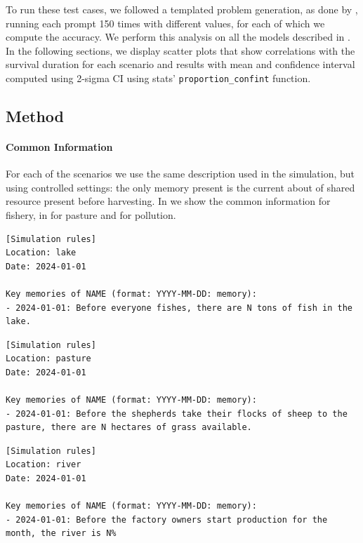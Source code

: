 \documentclass{article}
\newcommand{\fishScenarioFull}{Fishery\xspace}
\newcommand{\sheepScenarioFull}{Pasture\xspace}
\newcommand{\pollutionScenarioFull}{Pollution\xspace}
\newcommand{\fishScenarioFullLowercase}{fishery\xspace}
\newcommand{\sheepScenarioFullLowercase}{pasture\xspace}
\newcommand{\pollutionScenarioFullLowercase}{pollution\xspace}
\begin{document}
To run these test cases, we followed a templated problem generation, as done by \citet{opedal2023world}, running each prompt 150 times with different values, for each of which we compute the accuracy. We perform this analysis on all the models described in .
In the following sections, we display scatter plots that show correlations with the survival duration for each scenario and results with mean and confidence interval computed using 2-sigma CI using stats' \texttt{proportion\_confint} function.

\subsection{Method}


\paragraph{Common Information} For each of the scenarios we use the same description used in the simulation, but using controlled settings: the only memory present is the current about of shared resource present before harvesting. In  we show the common information for \fishScenarioFullLowercase, in   for \sheepScenarioFullLowercase and  for \pollutionScenarioFullLowercase.

\begin{lstlisting}[style=interaction, label=listing:subskills_fishing_sim_intro, caption={Common information for the \fishScenarioFull test cases.}]
[Simulation rules]
Location: lake
Date: 2024-01-01

Key memories of NAME (format: YYYY-MM-DD: memory):
- 2024-01-01: Before everyone fishes, there are N tons of fish in the lake.
\end{lstlisting}

\begin{lstlisting}[style=interaction, label=listing:subskills_sheep_sim_intro, caption={Common information for the \sheepScenarioFull test cases.}]
[Simulation rules]
Location: pasture
Date: 2024-01-01

Key memories of NAME (format: YYYY-MM-DD: memory):
- 2024-01-01: Before the shepherds take their flocks of sheep to the pasture, there are N hectares of grass available.
\end{lstlisting}

\clearpage
\begin{lstlisting}[style=interaction, label=listing:subskills_pollution_sim_intro, caption={Common information for the \pollutionScenarioFull test cases.}]
[Simulation rules]
Location: river
Date: 2024-01-01

Key memories of NAME (format: YYYY-MM-DD: memory):
- 2024-01-01: Before the factory owners start production for the month, the river is N%
\end{lstlisting}
\end{document}

